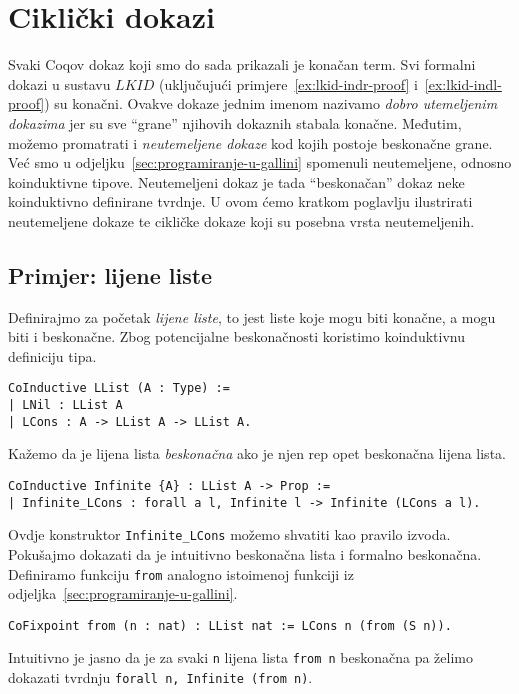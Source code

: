 \chapter{Ciklički dokazi}\label{cha:cikliki-dokazi}
Svaki Coqov dokaz koji smo do sada prikazali je konačan term.
Svi formalni dokazi u sustavu \(\mathit{LKID}\) (uključujući primjere~\ref{ex:lkid-indr-proof} i~\ref{ex:lkid-indl-proof}) su konačni.
Ovakve dokaze jednim imenom nazivamo \textit{dobro utemeljenim dokazima} jer su sve \enquote{grane} njihovih dokaznih stabala konačne.
Međutim, možemo promatrati i \textit{neutemeljene dokaze} kod kojih postoje beskonačne grane.
Već smo u odjeljku~\ref{sec:programiranje-u-gallini} spomenuli neutemeljene, odnosno koinduktivne tipove.
Neutemeljeni dokaz je tada \enquote{beskonačan} dokaz neke koinduktivno definirane tvrdnje.
U ovom ćemo kratkom poglavlju ilustrirati neutemeljene dokaze te cikličke dokaze koji su posebna vrsta neutemeljenih.

\section{Primjer: lijene liste}
Definirajmo za početak \textit{lijene liste}, to jest liste koje mogu biti konačne, a mogu biti i beskonačne.
Zbog potencijalne beskonačnosti koristimo koinduktivnu definiciju tipa.
\begin{verbatim}
CoInductive LList (A : Type) :=
| LNil : LList A
| LCons : A -> LList A -> LList A.
\end{verbatim}
\noindent Kažemo da je lijena lista \textit{beskonačna} ako je njen rep opet beskonačna lijena lista.
\begin{verbatim}
CoInductive Infinite {A} : LList A -> Prop :=
| Infinite_LCons : forall a l, Infinite l -> Infinite (LCons a l).
\end{verbatim}
\noindent Ovdje konstruktor \texttt{Infinite\_LCons} možemo shvatiti kao pravilo izvoda.
Pokušajmo dokazati da je intuitivno beskonačna lista i formalno beskonačna.
Definiramo funkciju \texttt{from} analogno istoimenoj funkciji iz odjeljka~\ref{sec:programiranje-u-gallini}.
\begin{verbatim}
CoFixpoint from (n : nat) : LList nat := LCons n (from (S n)).
\end{verbatim}
\noindent Intuitivno je jasno da je za svaki \texttt{n} lijena lista \texttt{from n}
beskonačna pa želimo dokazati tvrdnju \texttt{forall n, Infinite (from n)}.

